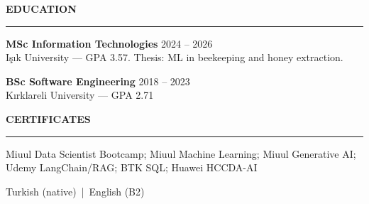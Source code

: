 \documentclass[11pt,a4paper]{article}
\newcommand{\cvsection}[1]{%
  \vspace{1.2em}%
  {\large\textbf{\MakeUppercase{#1}}}\\[0.2em]
  \hrule
  \vspace{0.6em}%
}
\begin{document}
\cvsection{Education}

\textbf{MSc Information Technologies} \hfill 2024 -- 2026\\
Işık University --- GPA 3.57. Thesis: ML in beekeeping and honey extraction.
\vspace{0.5em}

\textbf{BSc Software Engineering} \hfill 2018 -- 2023\\
Kırklareli University --- GPA 2.71

\cvsection{Certificates}

Miuul Data Scientist Bootcamp; Miuul Machine Learning; Miuul Generative AI; Udemy LangChain/RAG; BTK SQL; Huawei HCCDA-AI

\vspace{0.8em}
\begin{center}
  {\small Turkish (native) \,|\, English (B2)}
\end{center}
\end{document}
